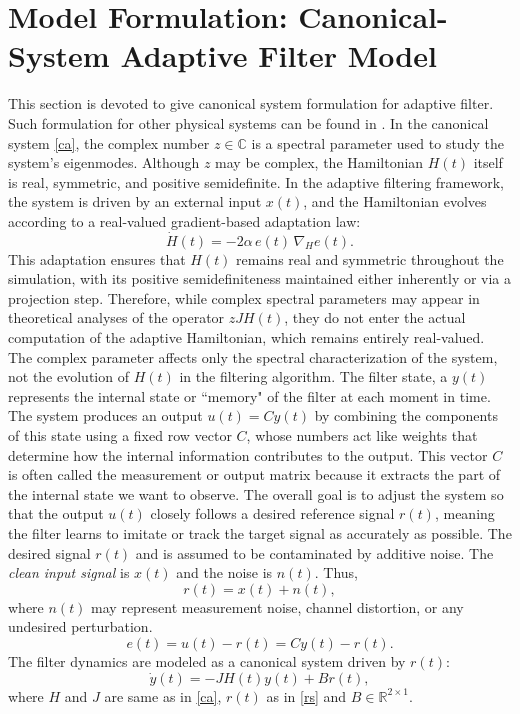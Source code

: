\documentclass[reqno]{amsart}
\numberwithin{equation}{section}
\begin{document}
\section{Model Formulation: Canonical-System Adaptive Filter Model }
This section is devoted to give canonical system formulation for adaptive filter. Such formulation for other physical systems can be found in \cite{ortega2023learnability,WidrowStearns1985}. In the canonical system \eqref{ca}, the  
 complex number $z \in \mathbb{C}$ is a spectral parameter used to study the system's eigenmodes. 
Although $z$ may be complex, the Hamiltonian $H(t)$ itself is real, symmetric, and positive semidefinite. 
In the adaptive filtering framework, the system is driven by an external input $x(t)$, and the Hamiltonian evolves according to a real-valued gradient-based adaptation law:
\begin{equation}
\dot H(t) = -2\alpha \, e(t) \, \nabla_H e(t).
\end{equation}
This adaptation ensures that $H(t)$ remains real and symmetric throughout the simulation, with its positive semidefiniteness maintained either inherently or via a projection step. 
Therefore, while complex spectral parameters may appear in theoretical analyses of the operator $z J H(t)$, they do not enter the actual computation of the adaptive Hamiltonian, which remains entirely real-valued. The complex parameter affects only the spectral characterization of the system, not the evolution of $H(t)$ in the filtering algorithm. The filter state, a \(y(t)\) represents the internal state or ``memory" of the filter at each moment in time. The system produces an output \(u(t) = C y(t)\) by combining the components of this state using a fixed row vector \(C\), whose numbers act like weights that determine how the internal information contributes to the output. This vector \(C\) is often called the measurement or output matrix because it extracts the part of the internal state we want to observe. The overall goal is to adjust the system so that the output \(u(t)\) closely follows a desired reference signal \(r(t)\), meaning the filter learns to imitate or track the target signal as accurately as possible. The  desired signal   $r(t)$ and is assumed to be contaminated by additive noise. The \emph{clean input signal} is $x(t)$ and
the noise is $n(t)$. Thus,
\begin{equation} \label{rs}
    r(t) = x(t) + n(t),
\end{equation}
where $n(t)$ may represent measurement noise, channel distortion, or any
undesired perturbation. 
\begin{equation}
    e(t) = u(t) - r(t) = C y(t) - r(t).
\end{equation}
The filter dynamics are modeled as a canonical system driven by $r(t)$:
\begin{equation}\label{aca}
    \dot{y}(t) = -J H(t) y(t) + B r(t),
\end{equation}
where $H$ and $J$ are same as in \eqref{ca}, $ r(t)$ as in \eqref{rs} and $B \in \mathbb{R}^{2 \times 1}.$\\
\end{document}
